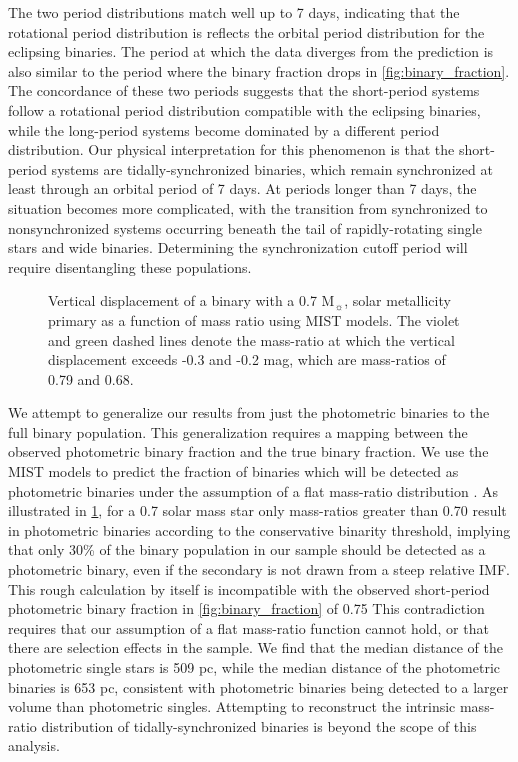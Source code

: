 \documentclass[manuscript]{aastex6}
\begin{document}
The two period distributions match well up to 7 days, indicating
that the rotational period distribution is reflects the orbital period
distribution for the eclipsing binaries. The period at which the data diverges
from the prediction is also similar to the period where the binary fraction 
drops in \cref{fig:binary_fraction}. The concordance of these two periods 
suggests that the short-period systems follow a 
rotational period distribution compatible with the eclipsing binaries, while 
the long-period systems become dominated by a different 
period distribution. Our physical interpretation for this phenomenon is that the
short-period systems are tidally-synchronized binaries, which remain 
synchronized at least through an orbital period of 7 days. At periods longer
than 7 days, the situation becomes more complicated, with the transition from
synchronized to nonsynchronized systems occurring beneath the tail of
rapidly-rotating single stars and wide binaries. Determining the
synchronization cutoff period will require disentangling these populations.

\begin{figure}[htb]
    \centering
    \caption{Vertical displacement of a binary with a 0.7 M\(_\sun\), solar
    metallicity primary as a function of mass ratio using MIST models. The
violet and green dashed lines denote the mass-ratio at which the vertical
displacement exceeds -0.3 and -0.2  mag, which are mass-ratios of 0.79 and
0.68.}\label{fig:photometric_massratio}
\end{figure}

We attempt to generalize our results from just the photometric binaries to the
full binary population. This generalization requires a mapping between the
observed photometric binary fraction and the true binary fraction. We use the
MIST models to predict the fraction of binaries which will be detected as
photometric binaries under the assumption of a flat mass-ratio distribution
\citep{Raghavan10}. As illustrated in \cref{fig:photometric_massratio}, for a 
0.7 solar mass star only mass-ratios greater than 0.70 result in photometric
binaries according to the conservative binarity threshold, implying that only
30\% of the binary population in our sample should be detected as a photometric 
binary, even if the secondary is not drawn from a steep relative IMF. This rough 
calculation by itself is incompatible with the observed 
short-period photometric binary fraction in \cref{fig:binary_fraction} of 0.75
This contradiction requires that our assumption of a flat mass-ratio function 
cannot hold, or that there are selection effects in the sample. We find that
the median distance of the photometric single stars is 509 pc, while the median
distance of the photometric binaries is 653 pc, consistent with photometric 
binaries being detected to a larger volume than photometric singles. Attempting 
to reconstruct the intrinsic mass-ratio distribution of tidally-synchronized 
binaries is beyond the scope of this analysis.
\end{document}
